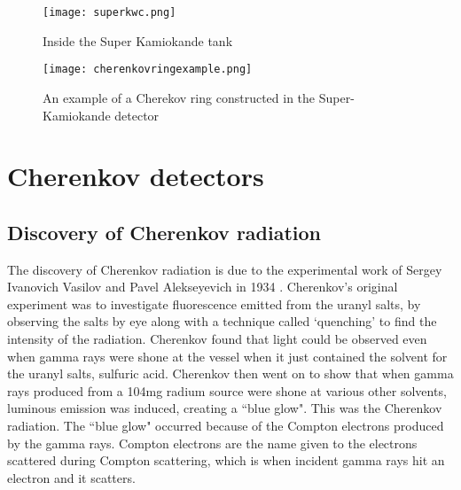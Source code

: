 \documentclass[11pt,oneside,a4paper]{article}
\begin{document}
\begin{figure}[htbp]
	\centering
	\texttt{[image: superkwc.png]}
	\captionsetup{justification=centering}
	\caption{Inside the Super Kamiokande tank}
	\label{fig:superkchamber}
\end{figure}

\begin{figure}[htbp]
	\centering
	\texttt{[image: cherenkovringexample.png]}
	\captionsetup{justification=centering}
	\caption{An example of a Cherekov ring constructed in the Super-Kamiokande detector}
	\label{fig:cherenkovring}
\end{figure}

\section{Cherenkov detectors}

\subsection{Discovery of Cherenkov radiation}

The discovery of Cherenkov radiation is due to the experimental work of Sergey Ivanovich Vasilov and Pavel Alekseyevich in 1934 \cite{cherenkovgammapaper}. Cherenkov's original experiment was to investigate fluorescence emitted from the uranyl salts, by observing the salts by eye along with a technique called `quenching' to find the intensity of the radiation. Cherenkov found that light could be observed even when gamma rays were shone at the vessel when it just contained the solvent for the uranyl salts, sulfuric acid. Cherenkov then went on to show that when gamma rays produced from a 104mg radium source were shone at various other solvents, luminous emission was induced, creating a ``blue glow". This was the Cherenkov radiation. The ``blue glow" occurred because of the Compton electrons produced by the gamma rays. Compton electrons are the name given to the electrons scattered during Compton scattering, which is when incident gamma rays hit an electron and it scatters.
\end{document}
